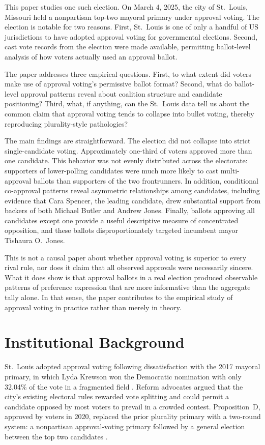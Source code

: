 \documentclass[11pt]{article}
\begin{document}
This paper studies one such election. On March 4, 2025, the city of St.~Louis, Missouri held a nonpartisan top-two mayoral primary under approval voting. The election is notable for two reasons. First, St.~Louis is one of only a handful of US jurisdictions to have adopted approval voting for governmental elections. Second, cast vote records from the election were made available, permitting ballot-level analysis of how voters actually used an approval ballot.

The paper addresses three empirical questions. First, to what extent did voters make use of approval voting's permissive ballot format? Second, what do ballot-level approval patterns reveal about coalition structure and candidate positioning? Third, what, if anything, can the St.~Louis data tell us about the common claim that approval voting tends to collapse into bullet voting, thereby reproducing plurality-style pathologies?

The main findings are straightforward. The election did not collapse into strict single-candidate voting. Approximately one-third of voters approved more than one candidate. This behavior was not evenly distributed across the electorate: supporters of lower-polling candidates were much more likely to cast multi-approval ballots than supporters of the two frontrunners. In addition, conditional co-approval patterns reveal asymmetric relationships among candidates, including evidence that Cara Spencer, the leading candidate, drew substantial support from backers of both Michael Butler and Andrew Jones. Finally, ballots approving all candidates except one provide a useful descriptive measure of concentrated opposition, and these ballots disproportionately targeted incumbent mayor Tishaura O.~Jones.

This is not a causal paper about whether approval voting is superior to every rival rule, nor does it claim that all observed approvals were necessarily sincere. What it does show is that approval ballots in a real election produced observable patterns of preference expression that are more informative than the aggregate tally alone. In that sense, the paper contributes to the empirical study of approval voting in practice rather than merely in theory.

\section{Institutional Background}
St.~Louis adopted approval voting following dissatisfaction with the 2017 mayoral primary, in which Lyda Krewson won the Democratic nomination with only 32.04\% of the vote in a fragmented field \citep{ballotpedia2017stl}. Reform advocates argued that the city's existing electoral rules rewarded vote splitting and could permit a candidate opposed by most voters to prevail in a crowded contest. Proposition~D, approved by voters in 2020, replaced the prior plurality primary with a two-round system: a nonpartisan approval-voting primary followed by a general election between the top two candidates \citep{stlapproves, ballotpedia2025primary}.
\end{document}
